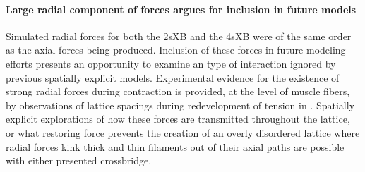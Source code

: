 \documentclass[]{article}
\begin{document}

\paragraph{Large radial component of forces argues for inclusion in future models} %
Simulated radial forces for both the 2sXB and the 4sXB were of the same order as the axial forces being produced. 
Inclusion of these forces in future modeling efforts presents an opportunity to examine an type of interaction ignored by previous spatially explicit models.
Experimental evidence for the existence of strong radial forces during contraction is provided, at the level of muscle fibers, by observations of lattice spacings during redevelopment of tension in \citet{Cecchi1990}. %
Spatially explicit explorations of how these forces are transmitted throughout the lattice, or what restoring force prevents the creation of an overly disordered lattice where radial forces kink thick and thin filaments out of their axial paths are possible with either presented crossbridge.
\end{document}
